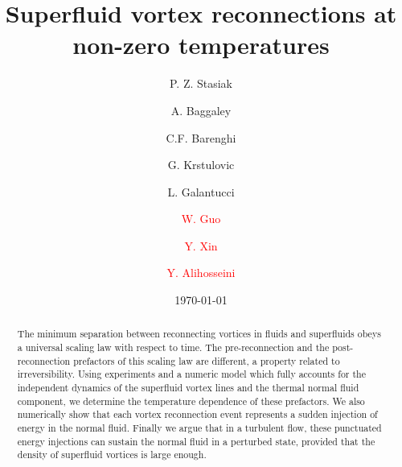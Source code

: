 \documentclass[%
 reprint,
 amsmath,amssymb,
 aps,
 prl,
]{revtex4-2}
\def\red#1{\textcolor{red}{#1}}
\begin{document}

\title{Superfluid vortex reconnections at non-zero temperatures}

\author{P. Z. Stasiak}
\author{A. Baggaley}
\author{C.F. Barenghi}

\author{G. Krstulovic}

\author{L. Galantucci}

\author{\red{W. Guo}}
\author{\red{Y. Xin}}
\author{\red{Y. Alihosseini}}
\affiliation{\red{Department of Mechanical Engineering, FAMU-FSU College of Engineering, Florida State University, Tallahassee, Florida 32310, USA}}
\date{\today}%

\begin{abstract}
The minimum separation between reconnecting vortices
in fluids and superfluids obeys a universal scaling law with respect to time.
The pre-reconnection and the post-reconnection prefactors 
of this scaling law are different, a property related to irreversibility.
Using experiments and a numeric model which fully accounts for the independent dynamics of the superfluid
vortex lines and the thermal normal fluid component, we determine the temperature
dependence of these prefactors. We also numerically show that each vortex reconnection event
represents a sudden injection of energy in the normal fluid. Finally we argue that
in a turbulent flow, these punctuated energy injections can sustain the normal fluid
in a perturbed state, provided that the density of superfluid vortices is large enough.
\end{abstract}

\maketitle
\end{document}
